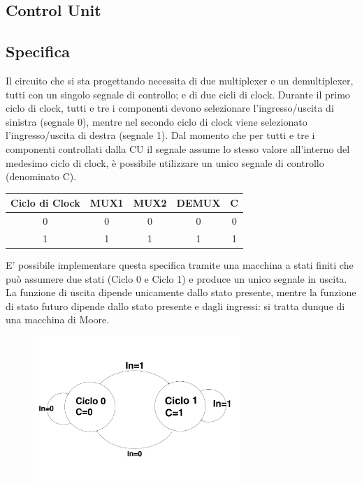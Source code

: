 \documentclass[10pt]{article}
\begin{document}
\begin{itemize}
\section{Control Unit}

\subsection{Specifica}
Il circuito che si sta progettando necessita di due multiplexer e un demultiplexer, tutti con un singolo segnale di controllo; e di due cicli di clock.
Durante il primo ciclo di clock, tutti e tre i componenti devono selezionare l'ingresso/uscita di sinistra (segnale 0), mentre nel secondo ciclo di clock viene selezionato l'ingresso/uscita
di destra (segnale 1).
Dal momento che per tutti e tre i componenti controllati dalla CU il segnale assume lo stesso valore all'interno del medesimo ciclo di clock, è possibile utilizzare un unico segnale
di controllo (denominato C).

\begin{table}[H]
    \begin{minipage}[c]{\textwidth}
    \centering
    \begin{tabular}{|c|ccc|c|}
        \hline
        \textbf{Ciclo di Clock} & \textbf{MUX1} & \textbf{MUX2} & \textbf{DEMUX} & \textbf{C}\\ \hline
        0                       & 0             & 0             & 0              & 0         \\ 
        1                       & 1             & 1             & 1              & 1         \\ \hline
        \end{tabular}
    \end{minipage}
    \end{table}

E' possibile implementare questa specifica tramite una macchina a stati finiti che può assumere due stati (Ciclo 0 e Ciclo 1) e produce un unico segnale in uscita. 
La funzione di uscita dipende unicamente dallo stato presente, mentre la funzione di stato futuro dipende dallo stato presente e dagli ingressi: si tratta dunque di una macchina di Moore.

\begin{figure}[H]
    \centering
    \includegraphics[width=0.7\textwidth]{statediag}
\end{figure}


\end{itemize}
\end{document}
